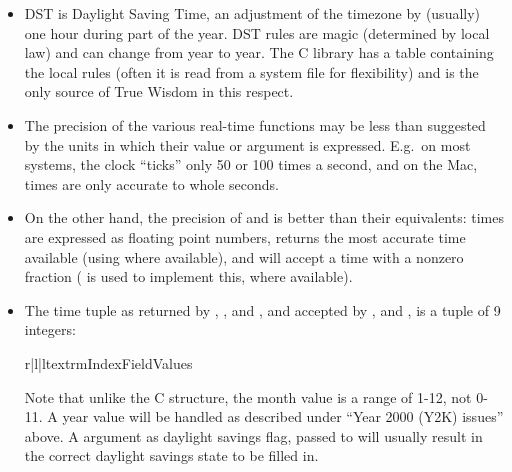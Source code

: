 \begin{itemize}
\item
DST is Daylight Saving Time, an adjustment
of the timezone by (usually) one hour during part of the year.  DST
rules are magic (determined by local law) and can change from year to
year.  The C library has a table containing the local rules (often it
is read from a system file for flexibility) and is the only source of
True Wisdom in this respect.

\item
The precision of the various real-time functions may be less than
suggested by the units in which their value or argument is expressed.
E.g.\ on most \UNIX{} systems, the clock ``ticks'' only 50 or 100 times a
second, and on the Mac, times are only accurate to whole seconds.

\item
On the other hand, the precision of  and
 is better than their \UNIX{} equivalents: times are
expressed as floating point numbers,  returns the
most accurate time available (using \UNIX{} 
where available), and  will accept a time with a
nonzero fraction (\UNIX{}  is used to implement
this, where available).

\item

The time tuple as returned by ,
, and , and accepted by
,  and ,
is a tuple of 9 integers:

\begin{tableiii}{r|l|l}{textrm}{Index}{Field}{Values}
\end{tableiii}

Note that unlike the C structure, the month value is a
range of 1-12, not 0-11.  A year value will be handled as described
under ``Year 2000 (Y2K) issues'' above.  A  argument as
daylight savings flag, passed to  will usually
result in the correct daylight savings state to be filled in.

\end{itemize}

